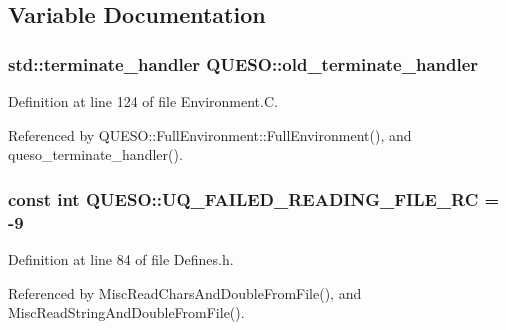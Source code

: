 \subsection{Variable Documentation}
\hypertarget{namespace_q_u_e_s_o_ac54b755ffb94b8896563c43fec9a6a4c}{
\subsubsection[{old\-\_\-terminate\-\_\-handler}]{\setlength{\rightskip}{0pt plus 5cm}std\-::terminate\-\_\-handler Q\-U\-E\-S\-O\-::old\-\_\-terminate\-\_\-handler}}\label{namespace_q_u_e_s_o_ac54b755ffb94b8896563c43fec9a6a4c}


Definition at line 124 of file Environment.\-C.



Referenced by Q\-U\-E\-S\-O\-::\-Full\-Environment\-::\-Full\-Environment(), and queso\-\_\-terminate\-\_\-handler().

\hypertarget{namespace_q_u_e_s_o_ab2cce05a6208cb239ef640a4ba6e5327}{
\subsubsection[{U\-Q\-\_\-\-F\-A\-I\-L\-E\-D\-\_\-\-R\-E\-A\-D\-I\-N\-G\-\_\-\-F\-I\-L\-E\-\_\-\-R\-C}]{\setlength{\rightskip}{0pt plus 5cm}const int Q\-U\-E\-S\-O\-::\-U\-Q\-\_\-\-F\-A\-I\-L\-E\-D\-\_\-\-R\-E\-A\-D\-I\-N\-G\-\_\-\-F\-I\-L\-E\-\_\-\-R\-C = -\/9}}\label{namespace_q_u_e_s_o_ab2cce05a6208cb239ef640a4ba6e5327}


Definition at line 84 of file Defines.\-h.



Referenced by Misc\-Read\-Chars\-And\-Double\-From\-File(), and Misc\-Read\-String\-And\-Double\-From\-File().

